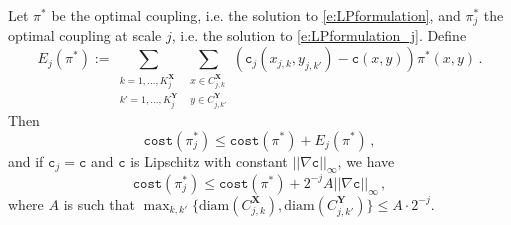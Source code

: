 \documentclass[twoside,11pt]{article}
\newcommand{\cost}[0]{\mathtt{c}}
\newcommand{\couplingcost}[0]{\mathtt{cost}}
\newcommand{\coupling}[0]{\pi}
\newcommand{\Xsp}{{\mathbf{X}}}
\newcommand{\Ysp}{{\mathbf{Y}}}
\begin{document}
\begin{proposition}
Let $\coupling^*$ be the optimal coupling, i.e. the solution to
\eqref{e:LPformulation}, and $\coupling^*_j$ the optimal coupling at scale $j$,
i.e. the solution to \eqref{e:LPformulation_j}. Define 
\begin{equation}
E_j(\coupling^*) := \sum_{\substack{k=1,\dots,K_j^{{\Xsp}}\\ k'=1,\dots,K_j^{{\Ysp}}}} 
  \sum_{\substack{x\in C^{{\Xsp}}_{j,k}\\ y\in C^{{\Ysp}}_{j,k'}}}
  \left(\cost_j(x_{j,k},y_{j,k'})-\cost(x,y)\right) \coupling^*(x,y)\,.
\end{equation}
Then
\begin{equation}
\couplingcost(\coupling_j^*)\le\couplingcost(\coupling^*)+E_j(\coupling^*)\,,
\label{e:UBcouplingcostpij}
\end{equation}
and if $\cost_j=\cost$ and $\cost$ is Lipschitz with constant $||\nabla\cost||_\infty$, we have 
\begin{equation}
\couplingcost(\coupling_j^*)\le\couplingcost(\coupling^*)+2^{-j}A||\nabla \cost||_\infty\,,
\label{e:UBcouplingcostpijboundednabld}
\end{equation}
where $A$ is such that
$\max_{k,k'}\{\mathrm{diam}(C^{{\Xsp}}_{j,k}),\mathrm{diam}(C^{{\Ysp}}_{j,k'})\}\le
A\cdot2^{-j}$.
\end{proposition}
\end{document}
